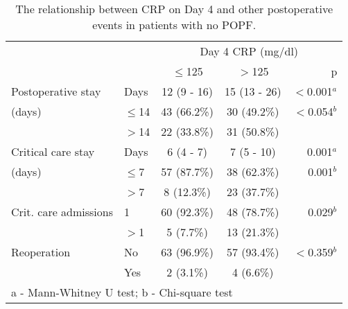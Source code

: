 \begin{table}[p]
	\centering
	\caption{The relationship between CRP on Day 4 and other postoperative events in patients with no POPF.}
	\label{table:crp_comp_CRP4_vs_LOS}
	\renewcommand{\arraystretch}{1.2} %
	\begin{tabular}{|l l | c c r |}
		\hline
		                      &          &  \multicolumn{3}{c|}{Day 4 CRP (mg/dl)}   \\
		                      &          & $\leq$125   & $>$125       & p            \\ \hline
		Postoperative stay    & Days     & 12 (9 - 16) & 15 (13 - 26) & $<$0.001$^a$ \\
		(days)                & $\leq$14 & 43 (66.2\%) & 30 (49.2\%)  & $<$0.054$^b$ \\
		                      & $>$14    & 22 (33.8\%) & 31 (50.8\%)  &  \\
		Critical care stay    & Days     & 6 (4 - 7)   & 7 (5 - 10)   & 0.001$^a$    \\
		(days)                & $\leq$7  & 57 (87.7\%) & 38 (62.3\%)  & 0.001$^b$    \\
		                      & $>$7     & 8 (12.3\%)  & 23 (37.7\%)  &  \\
		Crit. care admissions & 1        & 60 (92.3\%) & 48 (78.7\%)  & 0.029$^b$    \\
		                      & $>$1     & 5 (7.7\%)   & 13 (21.3\%)  &  \\
		Reoperation           & No       & 63 (96.9\%) & 57 (93.4\%)  & $<$0.359$^b$ \\
		                      & Yes      & 2 (3.1\%)   & 4 (6.6\%)    &  \\ \hline
		\multicolumn{5}{l}{a - Mann-Whitney U test; b - Chi-square test}
	\end{tabular}
\end{table}



